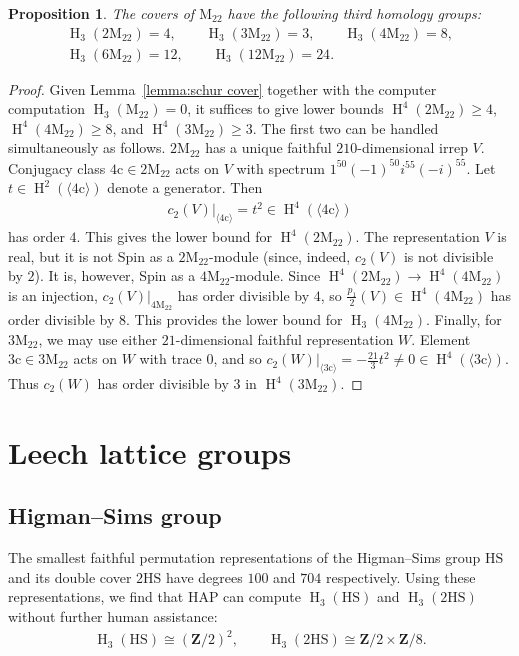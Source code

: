 \documentclass[pdftex]{sigma}
\numberwithin{equation}{section}
\newtheorem{Proposition}[Theorem]{Proposition}
 { \theoremstyle{definition}
\newtheorem{Remark}[Theorem]{Remark} }
\newcommand\bZ{\mathbf Z}
\newcommand\rc{\mathrm c}
\newcommand\rM{\mathrm M}
\DeclareMathOperator\homology{H}
\renewcommand\H{\homology}
\newcommand\<\langle
\renewcommand\>\rangle
\begin{document}
\begin{Proposition} \label{prop:mathieu}
 The covers of $\rM_{22}$ have the following third homology groups:
 \begin{gather*} \H_3(2\rM_{22}) = 4, \qquad \H_3(3\rM_{22}) = 3, \qquad \H_3(4\rM_{22}) = 8, \\ \H_3(6\rM_{22}) = 12, \qquad \H_3(12\rM_{22}) = 24.\end{gather*}
\end{Proposition}
\begin{proof} Given Lemma~\ref{lemma:schur cover} together with the computer computation $\H_3(\rM_{22}) = 0$, it suffices to give lower bounds $\H^4(2\rM_{22}) \geq 4$, $\H^4(4\rM_{22}) \geq 8$, and $\H^4(3\rM_{22}) \geq 3$. The first two can be handled simultaneously as follows. $2\rM_{22}$ has a unique faithful $210$-dimensional irrep $V$. Conjugacy class $4\rc \in 2\rM_{22}$ acts on $V$ with spectrum $1^{50} (-1)^{50} i^{55} (-i)^{55}$. Let $t \in \H^2(\langle 4\rc\rangle)$ denote a generator. Then
 \begin{gather*} c_2(V)|_{\langle 4\rc\rangle} = t^2 \in \H^4(\langle 4\rc\rangle) \end{gather*}
 has order $4$. This gives the lower bound for $\H^4(2\rM_{22})$. The representation $V$ is real, but it is not Spin as a $2\rM_{22}$-module (since, indeed, $c_2(V)$ is not divisible by $2$). It is, however, Spin as a $4\rM_{22}$-module. Since $\H^4(2\rM_{22}) \to \H^4(4\rM_{22})$ is an injection, $c_2(V)|_{4\rM_{22}}$ has order divisible by $4$, so $\frac{p_1}2(V) \in \H^4(4\rM_{22})$ has order divisible by $8$. This provides the lower bound for $\H_3(4\rM_{22})$. Finally, for $3\rM_{22}$, we may use either $21$-dimensional faithful representation $W$. Element $3\rc \in 3\rM_{22}$ acts on $W$ with trace $0$, and so $c_2(W)|_{\langle 3\rc\rangle} = -\frac{21}3t^2 \neq 0 \in \H^4(\langle 3\rc\rangle)$. Thus $c_2(W)$ has order divisible by $3$ in $\H^4(3\rM_{22})$.
\end{proof}

\section{Leech lattice groups} \label{sec:Leech}

\subsection{Higman--Sims group} \label{sub:HS}

The smallest faithful permutation representations of the Higman--Sims group $\mathrm{HS}$ and its double cover $2\mathrm{HS}$ have degrees $100$ and $704$ respectively.
Using these representations, we find that HAP can compute $\H_3(\mathrm{HS})$ and $\H_3(\mathrm{2HS})$ without further human assistance:
\begin{gather*} \H_3(\mathrm{HS}) \cong (\bZ/2)^2, \qquad \H_3(2\mathrm{HS}) \cong \bZ/2 \times \bZ/8.\end{gather*}
\end{document}
